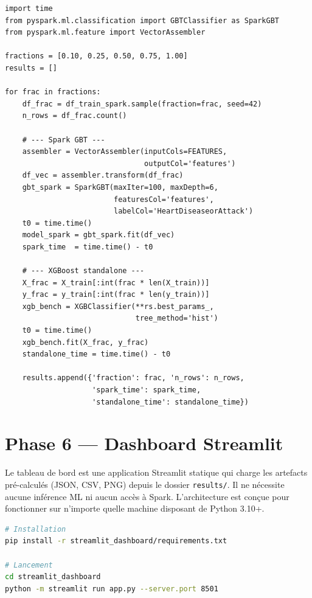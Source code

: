 \begin{lstlisting}[caption=Benchmark de performance par fraction, label=lst:benchmark]
import time
from pyspark.ml.classification import GBTClassifier as SparkGBT
from pyspark.ml.feature import VectorAssembler

fractions = [0.10, 0.25, 0.50, 0.75, 1.00]
results = []

for frac in fractions:
    df_frac = df_train_spark.sample(fraction=frac, seed=42)
    n_rows = df_frac.count()

    # --- Spark GBT ---
    assembler = VectorAssembler(inputCols=FEATURES,
                                outputCol='features')
    df_vec = assembler.transform(df_frac)
    gbt_spark = SparkGBT(maxIter=100, maxDepth=6,
                         featuresCol='features',
                         labelCol='HeartDiseaseorAttack')
    t0 = time.time()
    model_spark = gbt_spark.fit(df_vec)
    spark_time  = time.time() - t0

    # --- XGBoost standalone ---
    X_frac = X_train[:int(frac * len(X_train))]
    y_frac = y_train[:int(frac * len(y_train))]
    xgb_bench = XGBClassifier(**rs.best_params_,
                              tree_method='hist')
    t0 = time.time()
    xgb_bench.fit(X_frac, y_frac)
    standalone_time = time.time() - t0

    results.append({'fraction': frac, 'n_rows': n_rows,
                    'spark_time': spark_time,
                    'standalone_time': standalone_time})
\end{lstlisting}

\section{Phase 6 --- Dashboard Streamlit}

Le tableau de bord est une application Streamlit statique qui charge les artefacts pré-calculés (JSON, CSV, PNG) depuis le dossier \texttt{results/}. Il ne nécessite aucune inférence ML ni aucun accès à Spark. L'architecture est conçue pour fonctionner sur n'importe quelle machine disposant de Python 3.10+.

\begin{lstlisting}[caption=Lancement du dashboard, language=bash, style=pythonstyle]
# Installation
pip install -r streamlit_dashboard/requirements.txt

# Lancement
cd streamlit_dashboard
python -m streamlit run app.py --server.port 8501
\end{lstlisting}

